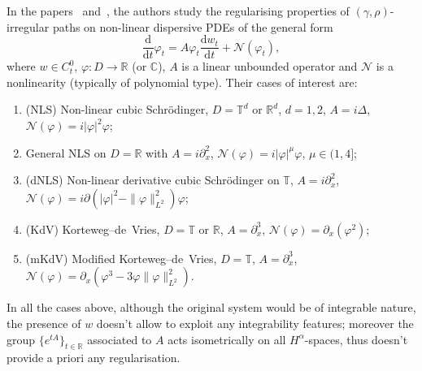 \documentclass[10pt]{article}
\newcommand{\mathd}{\mathrm{d}}
\newenvironment{enumeratenumeric}{\begin{enumerate}[1.] }{\end{enumerate}}
\begin{document}
In the papers~{\cite{choukgubinelli1}} and~{\cite{choukgubinelli2}}, the
authors study the regularising properties of $(\gamma, \rho)$\mbox{-}irregular
paths on non\mbox{-}linear dispersive PDEs of the general form
\begin{equation}
  \frac{\mathd}{\mathd t} \varphi_t = A \varphi_t  \frac{\mathd w_t}{\mathd t}
  + \mathcal{N} (\varphi_t), \label{sec6 choukgubinelli eq1}
\end{equation}
where $w \in C^0_t$, $\varphi : D \rightarrow \mathbb{R}$ (or $\mathbb{C}$),
$A$ is a linear unbounded operator and $\mathcal{N}$ is a nonlinearity
(typically of polynomial type). Their cases of interest are:
\begin{enumeratenumeric}
  \item (NLS) Non\mbox{-}linear cubic Schr\"{o}dinger, $D =\mathbb{T}^d$ or
  $\mathbb{R}^d$, $d = 1, 2$, $A = i \Delta$, $\mathcal{N} (\varphi) = i |
  \varphi |^2 \varphi$;
  
  \item General NLS on $D =\mathbb{R}$ with $A = i \partial_x^2$, $\mathcal{}
  \mathcal{N} (\varphi) = i | \varphi |^{\mu} \varphi$, $\mu \in (1, 4]$;
  
  \item (dNLS) Non\mbox{-}linear derivative cubic Schr\"{o}dinger on
  $\mathbb{T}$, $A = i \partial_x^2$, $\mathcal{N} (\varphi) = i \partial (|
  \varphi |^2 - \| \varphi \|_{L^2}^2) \varphi$;
  
  \item (KdV) Korteweg--de~Vries, $D =\mathbb{T}$ or $\mathbb{R}$, $A =
  \partial_x^3$, $\mathcal{N} (\varphi) = \partial_x (\varphi^2)$;
  
  \item (mKdV) Modified Korteweg--de~Vries, $D =\mathbb{T}$, $A =
  \partial_x^3$, $\mathcal{N} (\varphi) = \partial_x (\varphi^3 - 3 \varphi \|
  \varphi \|_{L^2}^2)$.
\end{enumeratenumeric}
In all the cases above, although the original system would be of integrable
nature, the presence of $w$ doesn't allow to exploit any integrability
features; moreover the group $\{ e^{t A} \}_{t \in \mathbb{R}}$ associated to
$A$ acts isometrically on all $H^{\alpha}$\mbox{-}spaces, thus doesn't provide
a priori any regularisation.
\end{document}
